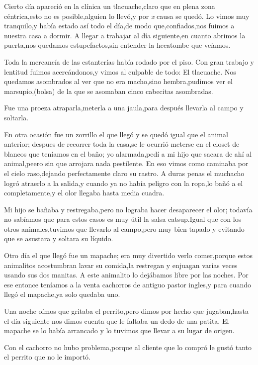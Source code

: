 \documentclass[letterpaper,12pt]{book}
\begin{document}
Cierto día apareció en la clínica un tlacuache,claro que en plena zona céntrica,esto no es posible,alguien lo llevó,y por {\it x }\/ causa se quedó. Lo vimos muy tranquilo,y había estado así todo el día,de modo que,confiados,nos fuimos a nuestra casa a dormir. A llegar a trabajar al día siguiente,en cuanto abrimos la puerta,nos quedamos estupefactos,sin entender la hecatombe que veíamos.

Toda la mercancía de las estanterías había rodado por el piso. Con gran trabajo y lentitud fuimos acercándonos,y vimos al culpable de todo: El tlacuache. Nos quedamos asombrados al ver que no era macho,sino hembra,pudimos ver el marsupio,(bolsa) de la que se asomaban cinco cabecitas asombradas.

Fue una proeza atraparla,meterla a una jaula,para después llevarla al campo y soltarla.

En otra ocasión fue un zorrillo el que llegó y se quedó igual que el animal anterior; despues de recorrer toda la casa,se le ocurrió meterse en el closet de blancos que teníamos en el baño; yo alarmada,pedí a mi hijo que sacara de ahí al animal,peero sin que arrojara nada pestilente. En eso vimos como caminaba por el cielo raso,dejando perfectamente claro su rastro. A duras penas el muchacho logró atraerlo a la salida,y cuando ya no había peligro con la ropa,lo bañó a el completamente,y el olor llegaba hasta media cuadra.

Mi hijo se bañaba y restregaba,pero no lograba hacer desaparecer el olor; todavía no sabíamos que para estos casos es muy útil la salsa catsup.Igual que con los otros animales,tuvimos que llevarlo al campo,pero muy bien tapado y evitando que se asustara y soltara su líquido. 

Otro día el que llegó fue un mapache; era muy divertido verlo comer,porque estos animalitos acostumbran lavar su comida,la restregan y enjuagan varias veces usando sus dos manitas. A este animalito lo dejábamos libre por las noches. Por ese entonce teníamos a la venta cachorros de antiguo pastor ingles,y para cuando llegó el mapache,ya solo quedaba uno.

Una noche oímos que gritaba el perrito,pero dimos por hecho que jugaban,hasta el día siguiente nos dimos cuenta que le faltaba un dedo de una patita. El mapache se lo había arrancado y lo tuvimos que llevar a su lugar de origen.

Con el cachorro no hubo problema,porque al cliente que lo compró le gustó tanto el perrito que no le importó.
\end{document}

